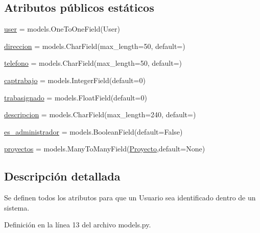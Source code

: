 \subsection*{Atributos públicos estáticos}
\begin{DoxyCompactItemize}
\item 
\hyperlink{classusuario_1_1models_1_1_user_profile_a8ef66edb95efb90536802ef5bd470f4b}{user} = models.\+One\+To\+One\+Field(User)
\item 
\hyperlink{classusuario_1_1models_1_1_user_profile_a9016f06733de7a060980d1bbbdb71d6b}{direccion} = models.\+Char\+Field(max\+\_\+length=50, default=\textquotesingle{}\textquotesingle{})
\item 
\hyperlink{classusuario_1_1models_1_1_user_profile_aa2435013de4597d25c50d0942d645b8f}{telefono} = models.\+Char\+Field(max\+\_\+length=50, default=\textquotesingle{}\textquotesingle{})
\item 
\hyperlink{classusuario_1_1models_1_1_user_profile_a12d9251950737efdaec07e682048d5c5}{captrabajo} = models.\+Integer\+Field(default=0)
\item 
\hyperlink{classusuario_1_1models_1_1_user_profile_ae243356225ccd5550d7df50a6acaecd7}{trabasignado} = models.\+Float\+Field(default=0)
\item 
\hyperlink{classusuario_1_1models_1_1_user_profile_a7a01376ce01bf33948434e7256ad05ff}{descripcion} = models.\+Char\+Field(max\+\_\+length=240, default=\textquotesingle{}\textquotesingle{})
\item 
\hyperlink{classusuario_1_1models_1_1_user_profile_a543c141ad4b4e7d2aaf13b11393cd527}{es\+\_\+administrador} = models.\+Boolean\+Field(default=False)
\item 
\hyperlink{classusuario_1_1models_1_1_user_profile_a4ff0ba6c2f673bd9a51264d11d805130}{proyectos} = models.\+Many\+To\+Many\+Field(\hyperlink{classproyectos_1_1models_1_1_proyecto}{Proyecto},default=None)
\end{DoxyCompactItemize}


\subsection{Descripción detallada}
\begin{DoxyVerb}Se definen todos los atributos para que un Usuario sea identificado dentro de un sistema.\end{DoxyVerb}
 

Definición en la línea 13 del archivo models.\+py.



